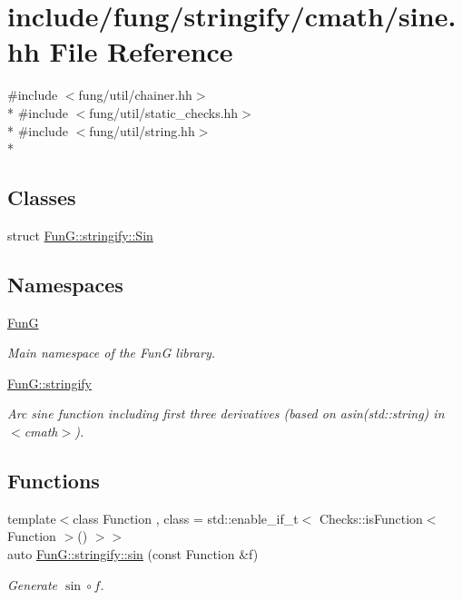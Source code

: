 \hypertarget{stringify_2cmath_2sine_8hh}{\section{include/fung/stringify/cmath/sine.hh File Reference}
\label{stringify_2cmath_2sine_8hh}
}
{\ttfamily \#include $<$fung/util/chainer.\-hh$>$}\\*
{\ttfamily \#include $<$fung/util/static\-\_\-checks.\-hh$>$}\\*
{\ttfamily \#include $<$fung/util/string.\-hh$>$}\\*
\subsection*{Classes}
\begin{DoxyCompactItemize}
\item 
struct \hyperlink{structFunG_1_1stringify_1_1Sin}{Fun\-G\-::stringify\-::\-Sin}
\end{DoxyCompactItemize}
\subsection*{Namespaces}
\begin{DoxyCompactItemize}
\item 
\hyperlink{namespaceFunG}{Fun\-G}
\begin{DoxyCompactList}\small\item\em Main namespace of the Fun\-G library. \end{DoxyCompactList}\item 
\hyperlink{namespaceFunG_1_1stringify}{Fun\-G\-::stringify}
\begin{DoxyCompactList}\small\item\em Arc sine function including first three derivatives (based on asin(std\-::string) in $<$cmath$>$). \end{DoxyCompactList}\end{DoxyCompactItemize}
\subsection*{Functions}
\begin{DoxyCompactItemize}
\item 
{\footnotesize template$<$class Function , class  = std\-::enable\-\_\-if\-\_\-t$<$ Checks\-::is\-Function$<$ Function $>$() $>$$>$ }\\auto \hyperlink{group__std_gaa44ea064dbf1d4befb6766de66a994e5}{Fun\-G\-::stringify\-::sin} (const Function \&f)
\begin{DoxyCompactList}\small\item\em Generate $ \sin\circ f $. \end{DoxyCompactList}\end{DoxyCompactItemize}
